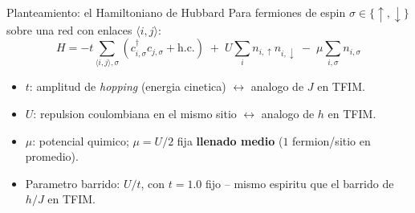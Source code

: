 \documentclass[aspectratio=169,10pt]{beamer}
\begin{document}
\begin{frame}{Planteamiento: el Hamiltoniano de Hubbard}
  Para fermiones de espin $\sigma\in\{\uparrow,\downarrow\}$ sobre una red con enlaces
  $\langle i,j\rangle$:
  \[
    H = -t \sum_{\langle i,j\rangle,\sigma}\left(c^\dagger_{i,\sigma} c_{j,\sigma} + \text{h.c.}\right)
        \;+\; U \sum_i n_{i,\uparrow} n_{i,\downarrow}
        \;-\; \mu \sum_{i,\sigma} n_{i,\sigma}
  \]
  \begin{itemize}
    \item $t$: amplitud de \emph{hopping} (energia cinetica) $\leftrightarrow$ analogo de $J$ en TFIM.
    \item $U$: repulsion coulombiana en el mismo sitio $\leftrightarrow$ analogo de $h$ en TFIM.
    \item $\mu$: potencial quimico; $\mu = U/2$ fija \textbf{llenado medio} ($1$ fermion/sitio en promedio).
    \item Parametro barrido: $U/t$, con $t=1.0$ fijo -- mismo espiritu que el barrido de $h/J$ en TFIM.
  \end{itemize}
\end{frame}
\end{document}
